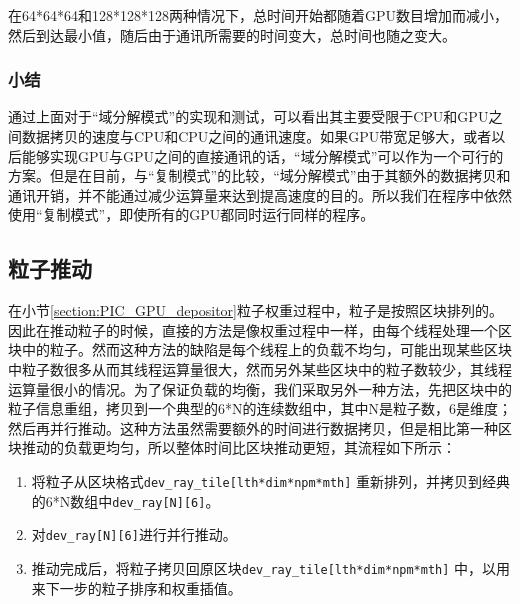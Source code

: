 在64*64*64和128*128*128两种情况下，总时间开始都随着GPU数目增加而减小，然后到达最小值，随后由于通讯所需要的时间变大，总时间也随之变大。
\subsubsection{小结}
通过上面对于“域分解模式”的实现和测试，可以看出其主要受限于CPU和GPU之间数据拷贝的速度与CPU和CPU之间的通讯速度。如果GPU带宽足够大，或者以后能够实现GPU与GPU之间的直接通讯的话，“域分解模式”可以作为一个可行的方案。但是在目前，与“复制模式”的比较，“域分解模式”由于其额外的数据拷贝和通讯开销，并不能通过减少运算量来达到提高速度的目的。所以我们在程序中依然使用“复制模式”，即使所有的GPU都同时运行同样的程序。

\subsection{粒子推动}
在小节\ref{section:PIC_GPU_depositor}粒子权重过程中，粒子是按照区块排列的。因此在推动粒子的时候，直接的方法是像权重过程中一样，由每个线程处理一个区块中的粒子。然而这种方法的缺陷是每个线程上的负载不均匀，可能出现某些区块中粒子数很多从而其线程运算量很大，然而另外某些区块中的粒子数较少，其线程运算量很小的情况。为了保证负载的均衡，我们采取另外一种方法，先把区块中的粒子信息重组，拷贝到一个典型的6*N的连续数组中，其中N是粒子数，6是维度；然后再并行推动。这种方法虽然需要额外的时间进行数据拷贝，但是相比第一种区块推动的负载更均匀，所以整体时间比区块推动更短，其流程如下所示：
\begin{enumerate}
  \item 将粒子从区块格式\verb"dev_ray_tile[lth*dim*npm*mth]" 重新排列，并拷贝到经典的6*N数组中\verb"dev_ray[N][6]"。
  \item 对\verb"dev_ray[N][6]"进行并行推动。
  \item 推动完成后，将粒子拷贝回原区块\verb"dev_ray_tile[lth*dim*npm*mth]" 中，以用来下一步的粒子排序和权重插值。
\end{enumerate}


